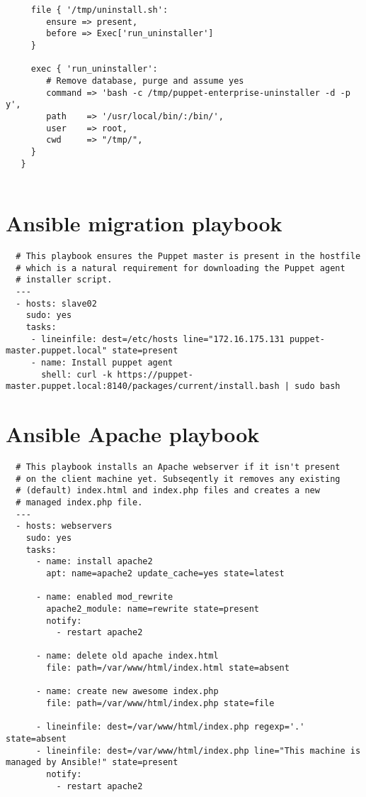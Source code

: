 \begin{appendices}
\begin{lstlisting}
     file { '/tmp/uninstall.sh': 
        ensure => present,      
        before => Exec['run_uninstaller']                  
     }

     exec { 'run_uninstaller':
        # Remove database, purge and assume yes
        command => 'bash -c /tmp/puppet-enterprise-uninstaller -d -p y',
        path    => '/usr/local/bin/:/bin/',
        user	=> root,
        cwd     => "/tmp/",
     }
   }
 
  \end{lstlisting}
  
  \newpage  
  \section{Ansible migration playbook} \label{app:ansiblemigration}
  \begin{lstlisting}
  # This playbook ensures the Puppet master is present in the hostfile
  # which is a natural requirement for downloading the Puppet agent 
  # installer script.
  ---
  - hosts: slave02
    sudo: yes
    tasks:
     - lineinfile: dest=/etc/hosts line="172.16.175.131 puppet-master.puppet.local" state=present
     - name: Install puppet agent
       shell: curl -k https://puppet-master.puppet.local:8140/packages/current/install.bash | sudo bash
  \end{lstlisting}

  \newpage
  \section{Ansible Apache playbook} \label{app:ansibleplaybook}
  \begin{lstlisting}
  # This playbook installs an Apache webserver if it isn't present
  # on the client machine yet. Subseqently it removes any existing
  # (default) index.html and index.php files and creates a new
  # managed index.php file.  
  ---
  - hosts: webservers
    sudo: yes
    tasks:
      - name: install apache2
        apt: name=apache2 update_cache=yes state=latest

      - name: enabled mod_rewrite
        apache2_module: name=rewrite state=present
        notify:
          - restart apache2

      - name: delete old apache index.html
        file: path=/var/www/html/index.html state=absent

      - name: create new awesome index.php
        file: path=/var/www/html/index.php state=file

      - lineinfile: dest=/var/www/html/index.php regexp='.' state=absent
      - lineinfile: dest=/var/www/html/index.php line="This machine is managed by Ansible!" state=present
        notify:
          - restart apache2


\end{lstlisting}
\end{appendices}
